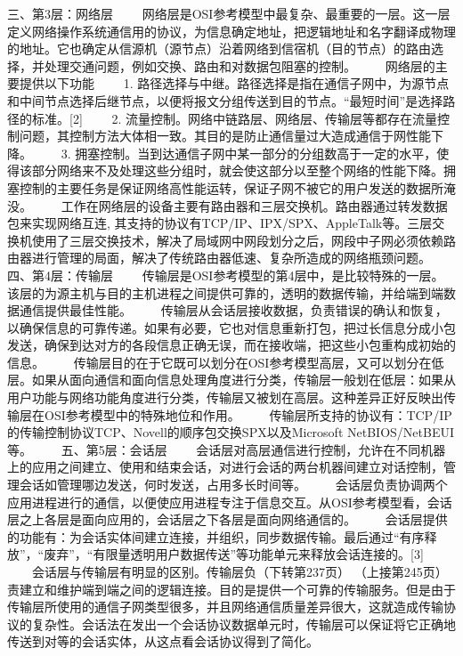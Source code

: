         三、第3层：网络层
　　网络层是OSI参考模型中最复杂、最重要的一层。这一层定义网络操作系统通信用的协议，为信息确定地址，把逻辑地址和名字翻译成物理的地址。它也确定从信源机（源节点）沿着网络到信宿机（目的节点）的路由选择，并处理交通问题，例如交换、路由和对数据包阻塞的控制。
　　网络层的主要提供以下功能
　　1.  路径选择与中继。路径选择是指在通信子网中，为源节点和中间节点选择后继节点，以便将报文分组传送到目的节点。“最短时间”是选择路径的标准。[2]
　　2.  流量控制。网络中链路层、网络层、传输层等都存在流量控制问题，其控制方法大体相一致。其目的是防止通信量过大造成通信于网性能下降。
　　3.  拥塞控制。当到达通信子网中某一部分的分组数高于一定的水平，使得该部分网络来不及处理这些分组时，就会使这部分以至整个网络的性能下降。拥塞控制的主要任务是保证网络高性能运转，保证子网不被它的用户发送的数据所淹没。
　　工作在网络层的设备主要有路由器和三层交换机。路由器通过转发数据包来实现网络互连, 其支持的协议有TCP/IP、IPX/SPX、AppleTalk等。三层交换机使用了三层交换技术，解决了局域网中网段划分之后，网段中子网必须依赖路由器进行管理的局面，解决了传统路由器低速、复杂所造成的网络瓶颈问题。
        四、第4层：传输层
　　传输层是OSI参考模型的第4层中，是比较特殊的一层。该层的为源主机与目的主机进程之间提供可靠的，透明的数据传输，并给端到端数据通信提供最佳性能。
　　传输层从会话层接收数据，负责错误的确认和恢复，以确保信息的可靠传递。如果有必要，它也对信息重新打包，把过长信息分成小包发送，确保到达对方的各段信息正确无误，而在接收端，把这些小包重构成初始的信息。
　　传输层目的在于它既可以划分在OSI参考模型高层，又可以划分在低层。如果从面向通信和面向信息处理角度进行分类，传输层一般划在低层：如果从用户功能与网络功能角度进行分类，传输层又被划在高层。这种差异正好反映出传输层在OSI参考模型中的特殊地位和作用。
　　传输层所支持的协议有：TCP/IP的传输控制协议TCP、Novell的顺序包交换SPX以及Microsoft NetBIOS/NetBEUI等。
　　五、第5层：会话层
　　会话层对高层通信进行控制，允许在不同机器上的应用之间建立、使用和结束会话，对进行会话的两台机器间建立对话控制，管理会话如管理哪边发送，何时发送，占用多长时间等。
　　会话层负责协调两个应用进程进行的通信，以便使应用进程专注于信息交互。从OSI参考模型看，会话层之上各层是面向应用的，会话层之下各层是面向网络通信的。
　　会话层提供的功能有：为会话实体间建立连接，并组织，同步数据传输。最后通过“有序释放”，“废弃”，“有限量透明用户数据传送”等功能单元来释放会话连接的。[3]
　　会话层与传输层有明显的区别。传输层负（下转第237页）
（上接第245页）责建立和维护端到端之间的逻辑连接。目的是提供一个可靠的传输服务。但是由于传输层所使用的通信子网类型很多，并且网络通信质量差异很大，这就造成传输协议的复杂性。会话法在发出一个会话协议数据单元时，传输层可以保证将它正确地传送到对等的会话实体，从这点看会话协议得到了简化。
